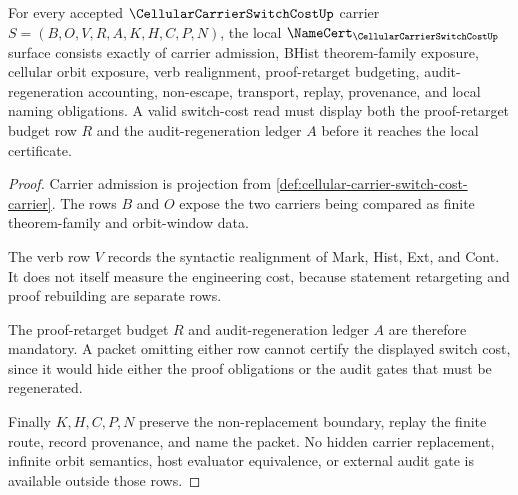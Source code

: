 \begin{theorem}
\label{thm:cellular-carrier-switch-cost-namecert-obligations}
For every accepted $\CellularCarrierSwitchCostUp$ carrier $S=(B,O,V,R,A,K,H,C,P,N)$, the local $\NameCert_{\CellularCarrierSwitchCostUp}$ surface consists exactly of carrier admission, BHist theorem-family exposure, cellular orbit exposure, verb realignment, proof-retarget budgeting, audit-regeneration accounting, non-escape, transport, replay, provenance, and local naming obligations. A valid switch-cost read must display both the proof-retarget budget row $R$ and the audit-regeneration ledger $A$ before it reaches the local certificate.
\end{theorem}
\begin{proof}
Carrier admission is projection from \autoref{def:cellular-carrier-switch-cost-carrier}. The rows $B$ and $O$ expose the two carriers being compared as finite theorem-family and orbit-window data.

The verb row $V$ records the syntactic realignment of Mark, Hist, Ext, and Cont. It does not itself measure the engineering cost, because statement retargeting and proof rebuilding are separate rows.

The proof-retarget budget $R$ and audit-regeneration ledger $A$ are therefore mandatory. A packet omitting either row cannot certify the displayed switch cost, since it would hide either the proof obligations or the audit gates that must be regenerated.

Finally $K,H,C,P,N$ preserve the non-replacement boundary, replay the finite route, record provenance, and name the packet. No hidden carrier replacement, infinite orbit semantics, host evaluator equivalence, or external audit gate is available outside those rows.
\end{proof}

